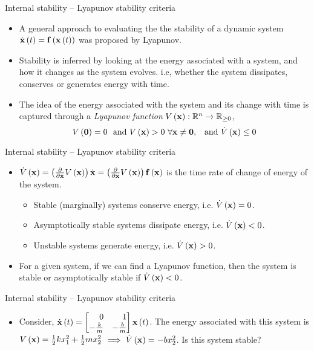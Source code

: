 \documentclass[aspectratio=169]{beamer}
\def\mf{\ensuremath\mathbf}
\def\mb{\ensuremath\mathbb}
\def\lp{\ensuremath\left(}
\def\rp{\ensuremath\right)}
\def\bmx{\ensuremath\begin{bmatrix*}[r]}
\def\emx{\ensuremath\end{bmatrix*}}
\newcommand{\ct}[1]{\lp #1\rp}
\begin{document}
\begin{frame}[t]{Internal stability -- Lyapunov stability criteria}
\begin{itemize}
    \item A general approach to evaluating the the stability of a dynamic system $\dot{\mf{x}}\ct{t} = \mf{f}\ct{\mf{x}\ct{t}}$ was proposed by Lyapunov. 

    \item Stability is inferred by looking at the energy associated with a system, and how it changes as the system evolves. i.e, whether the system dissipates, conserves or generates energy with time.

    \item The idea of the energy associated with the system and its change with time is captured through a \textit{Lyapunov function} $V\ct{\mf{x}}: \mb{R}^n \to \mb{R}_{\geq 0}$,
    \[ V\ct{\mf{0}} = 0 \,\, \text{ and } V\ct{\mf{x}} > 0 \,\, \forall \mf{x} \neq \mf{0}, \,\,\, \text{ and } \dot{V}\ct{\mf{x}} \leq 0 \]
\end{itemize}
\end{frame}


\begin{frame}[t]{Internal stability -- Lyapunov stability criteria}
\begin{itemize}
    \item $\dot{V}\ct{\mf{x}} = \ct{\frac{\partial}{\partial\mf{x}}V\ct{\mf{x}}}\dot{\mf{x}} = \ct{\frac{\partial}{\partial\mf{x}}V\ct{\mf{x}}}\mf{f}\ct{\mf{x}}$ is the time rate of change of energy of the system. 

    \begin{itemize}
        \item Stable (marginally) systems conserve energy, i.e. $\dot{V}\ct{\mf{x}} = 0$.
        \item Asymptotically stable systems dissipate energy, i.e. $\dot{V}\ct{\mf{x}} < 0$.
        \item Unstable systems generate energy, i.e. $\dot{V}\ct{\mf{x}} > 0$.
    \end{itemize}

    \item For a given system, if we can find a Lyapunov function, then the system is stable or asymptotically stable if $\dot{V}\ct{\mf{x}} < 0$.
\end{itemize}
\end{frame}


\begin{frame}[t]{Internal stability -- Lyapunov stability criteria}
\begin{itemize}
    \item Consider, $\dot{\mf{x}}\ct{t} = \bmx 0 & 1 \\ -\frac{k}{m} & -\frac{b}{m} \emx\mf{x}\ct{t}$. The energy associated with this system is $V\ct{\mf{x}} = \frac{1}{2}kx_1^2 + \frac{1}{2}mx_2^2$ $\implies \dot{V}\ct{\mf{x}} = -b x_2^2$. Is this system stable?
\end{itemize}
\end{frame}
\end{document}
